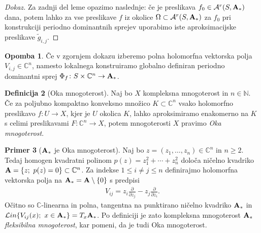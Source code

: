 \documentclass[12pt,a4paper,twoside]{article}
\theoremstyle{definition} %
\newtheorem{definicija}{Definicija}[section]
\newtheorem{primer}[definicija]{Primer}
\newtheorem{opomba}[definicija]{Opomba}
\newenvironment{dokaz}[1][Dokaz]{\begin{proof}[#1]}{\end{proof}}
\theoremstyle{plain} %
\numberwithin{equation}{section}  %
\begin{document}
\begin{dokaz}
Za zadnji del leme opazimo naslednje: če je preslikava $f_{0} \in \mathcal{A}^{r}(S, \textbf{\textup{A}}_{*})$ dana, potem lahko za vse preslikave $f$ iz okolice $\Omega \subset \mathcal{A}^{r}(S, \textbf{\textup{A}}_{*})$ za $f_{0}$ pri konstrukciji periodno dominantnih sprejev uporabimo iste aproksimacijske preslikave $\tilde{g}_{i,j}$.
\end{dokaz}

\begin{opomba}
Če v zgornjem dokazu izberemo polna holomorfna vektorska polja $V_{i,j} \in \mathbb{C}^{n}$, namesto lokalnega konstruiramo globalno definiran periodno dominantni sprej $\Phi_{f} \colon S \times \mathbb{C}^{n} \to \textbf{\textup{A}}_{*}$.
\end{opomba}

%
\begin{definicija} [Oka mnogoterost]
Naj bo $X$ kompleksna mnogoterost in $n \in \mathbb{N}$. Če za poljubno kompaktno konveksno množico $K \subset \mathbb{C}^{n}$ vsako holomorfno preslikavo $f \colon U \to X$, kjer je $U$ okolica $K$, lahko aproksimiramo enakomerno na $K$ s celimi preslikavami $F \colon \mathbb{C}^{n} \to X$, potem mnogoterosti $X$ pravimo \emph{Oka mnogoterost}.
\end{definicija}

\begin{primer} [$\textbf{\textup{A}}_{*}$ je Oka mnogoterost]
Naj bo $z = (z_{1}, \dots , z_{n}) \in \mathbb{C}^{n}$ in $n \geq 2$. Tedaj  homogen kvadratni polinom $p(z) = z_{1}^{2} + \cdots + z_{n}^{2}$ določa ničelno kvadriko $\textbf{\textup{A}} = \{z ; \ p(z)=0 \} \subset \mathbb{C}^{n}$.
Za indekse $1 \leq i \neq j \leq n$ definirajmo holomorfna vektorska polja na $ \textbf{\textup{A}}_{*} = \textbf{\textup{A}} \setminus \{ 0 \}$ s predpisi
\begin{gather*}
V_{ij} = z_{i} \frac{\partial}{\partial z_{j}} - z_{j} \frac{\partial}{\partial z_{i}}.
\end{gather*}
Očitno so $\mathbb{C}$-linearna in polna, tangentna na punktirano ničelno kvadriko $\textbf{\textup{A}}_{*}$ in $\mathcal{L}in \{ V_{ij}(x) ; \ x \in \textbf{\textup{A}}_{*} \} = T_{x}\textbf{\textup{A}}_{*}$. Po definiciji je zato kompleksna mnogoterost $\textbf{\textup{A}}_{*}$ \emph{fleksibilna mnogoterost}, kar pomeni, da je tudi Oka mnogoterost.
\end{primer}
\end{document}
